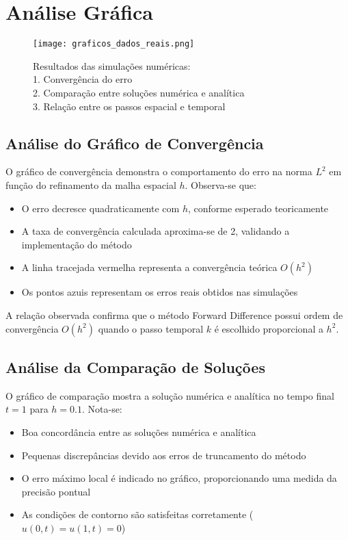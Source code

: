\documentclass[10pt,twocolumn]{article}
\begin{document}
\section{Análise Gráfica}

\begin{figure}[H]
\centering
\texttt{[image: graficos\_dados\_reais.png]}
\caption{Resultados das simulações numéricas:\\
1. Convergência do erro\\
2. Comparação entre soluções numérica e analítica\\
3. Relação entre os passos espacial e temporal}
\label{fig:resultados}
\end{figure}

\subsection{Análise do Gráfico de Convergência}

O gráfico de convergência demonstra o comportamento do erro na norma $L^2$ em função do refinamento da malha espacial $h$. Observa-se que:

\begin{itemize}
    \item O erro decresce quadraticamente com $h$, conforme esperado teoricamente
    \item A taxa de convergência calculada aproxima-se de 2, validando a implementação do método
    \item A linha tracejada vermelha representa a convergência teórica $O(h^2)$
    \item Os pontos azuis representam os erros reais obtidos nas simulações
\end{itemize}

A relação observada confirma que o método Forward Difference possui ordem de convergência $O(h^2)$ quando o passo temporal $k$ é escolhido proporcional a $h^2$.

\subsection{Análise da Comparação de Soluções}

O gráfico de comparação mostra a solução numérica e analítica no tempo final $t = 1$ para $h = 0.1$. Nota-se:

\begin{itemize}
    \item Boa concordância entre as soluções numérica e analítica
    \item Pequenas discrepâncias devido aos erros de truncamento do método
    \item O erro máximo local é indicado no gráfico, proporcionando uma medida da precisão pontual
    \item As condições de contorno são satisfeitas corretamente ($u(0,t) = u(1,t) = 0$)
\end{itemize}
\end{document}
